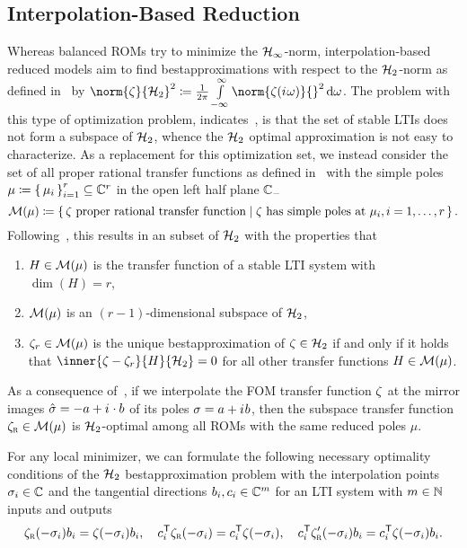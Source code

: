 \subsection{Interpolation-Based Reduction}\label{subsec:interpolation-reduction}

Whereas balanced \acp{ROM} try to minimize the $\mathcal{H}_\infty$-norm, interpolation-based reduced models aim to find bestapproximations with respect to the $\mathcal{H}_2$-norm as defined in~\cite[Section~3]{Gugercin2008} by $\norm{\tfunc}{\mcl{H}_2}^2 \coloneqq \frac{1}{2 \pi} \int\limits_{- \infty}^\infty \norm{\tfunc(\iu \omega)}{}^2 \dif \omega$.
The problem with this type of optimization problem, indicates~\cite[Section~3.1]{Gugercin2008}, is that the set of stable \acp{LTI} does not form a subspace of $\mathcal{H}_2$, whence the $\mathcal{H}_2$ optimal approximation is not easy to characterize.
As a replacement for this optimization set, we instead consider the set of all proper rational transfer functions as defined in~\cite[Section~1.3.1]{Corless2003} with the simple poles $\mu \coloneqq {\left\{\,\mu_i\,\right\}}_{i = 1}^r \subseteq \mathbb{C}^r$ in the open left half plane $\mathbb{C}_{-}$
\begin{equation*}
    \mathcal{M}(\mu) \coloneqq \left\{\,\zeta \text{ proper rational transfer function}\mid\zeta \text{ has simple poles at } \mu_i, i = 1, \dots, r\,\right\}.
\end{equation*}
Following~\cite[Theorem~3.1]{Gugercin2008}, this results in an subset of $\mathcal{H}_2$ with the properties that
\begin{enumerate}
    \item $H \in \mathcal{M}(\mu)$ is the transfer function of a stable \ac{LTI} system with $\dim{(H)} = r$,
    \item $\mathcal{M}(\mu)$ is an $(r - 1)$-dimensional subspace of $\mathcal{H}_2$,
    \item $\zeta_r \in \mathcal{M}(\mu)$ is the unique bestapproximation of $\zeta \in \mathcal{H}_2$ if and only if it holds that $\inner{\tfunc - \tfunc_r}{H}{\mcl{H}_2} = 0$ for all other transfer functions $H \in \mathcal{M}(\mu)$.
\end{enumerate}
As a consequence of~\cite[Theorem~3.1]{Gugercin2008}, if we interpolate the \ac{FOM} transfer function $\zeta$ at the mirror images $\hat{\sigma} = -a + {i\mkern1mu} \cdot b$ of its poles $\sigma = a + {i\mkern1mu} b$, then the subspace transfer function $\zeta_{\textnormal{\scshape r}} \in \mathcal{M}(\mu)$ is $\mathcal{H}_2$-optimal among all \acp{ROM} with the same reduced poles $\mu$.

For any local minimizer, we can formulate the following necessary optimality conditions of the $\mathcal{H}_2$ bestapproximation problem with the interpolation points $\sigma_i \in \mathbb{C}$ and the tangential directions $b_i, c_i \in \mathbb{C}^{m}$ for an \ac{LTI} system with $m \in \mathbb{N}$ inputs and outputs
\begin{equation}\label{eq:h2-optimality-conditions}
    \zeta_{\textnormal{\scshape r}}(- \sigma_i) b_i = \zeta(- \sigma_i) b_i,\quad c_i^{\mkern1mu \mathsf{T}} \zeta_{\textnormal{\scshape r}}(- \sigma_i) = c_i^{\mkern1mu \mathsf{T}} \zeta(- \sigma_i),\quad c_i^{\mkern1mu \mathsf{T}} \zeta'_{\textnormal{\scshape r}}(- \sigma_i) b_i = c_i^{\mkern1mu \mathsf{T}} \zeta(- \sigma_i) b_i.
\end{equation}

